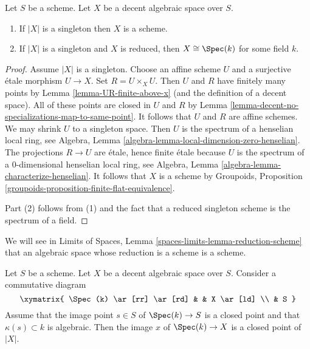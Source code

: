 \begin{lemma}
\label{lemma-when-field}
Let $S$ be a scheme. Let $X$ be a decent algebraic space over $S$.
\begin{enumerate}
\item If $|X|$ is a singleton then $X$ is a scheme.
\item If $|X|$ is a singleton and $X$ is reduced, then
$X \cong \Spec(k)$ for some field $k$.
\end{enumerate}
\end{lemma}

\begin{proof}
Assume $|X|$ is a singleton.
Choose an affine scheme $U$ and a surjective \'etale morphism $U \to X$.
Set $R = U \times_X U$. Then $U$ and $R$ have finitely many points by
Lemma \ref{lemma-UR-finite-above-x} (and the definition of a decent space).
All of these points are closed in $U$ and $R$ by
Lemma \ref{lemma-decent-no-specializations-map-to-same-point}.
It follows that $U$ and $R$ are affine schemes.
We may shrink $U$ to a singleton space. Then $U$ is
the spectrum of a henselian local ring, see
Algebra, Lemma \ref{algebra-lemma-local-dimension-zero-henselian}.
The projections $R \to U$ are \'etale, hence finite \'etale because
$U$ is the spectrum of a $0$-dimensional henselian local ring, see
Algebra, Lemma \ref{algebra-lemma-characterize-henselian}.
It follows that $X$ is a scheme by
Groupoids, Proposition \ref{groupoids-proposition-finite-flat-equivalence}.

\medskip\noindent
Part (2) follows from (1) and the fact that a reduced singleton
scheme is the spectrum of a field.
\end{proof}

\begin{remark}
\label{remark-one-point-decent-scheme}
We will see in
Limits of Spaces, Lemma \ref{spaces-limits-lemma-reduction-scheme}
that an algebraic space
whose reduction is a scheme is a scheme.
\end{remark}

\begin{lemma}
\label{lemma-algebraic-residue-field-extension-closed-point}
Let $S$ be a scheme. Let $X$ be a decent algebraic space over $S$.
Consider a commutative diagram
$$
\xymatrix{
\Spec(k) \ar[rr] \ar[rd] & & X \ar[ld] \\
& S
}
$$
Assume that the image point $s \in S$ of $\Spec(k) \to S$ is
a closed point and that $\kappa(s) \subset k$ is algebraic.
Then the image $x$ of $\Spec(k) \to X$ is a closed point of $|X|$.
\end{lemma}

